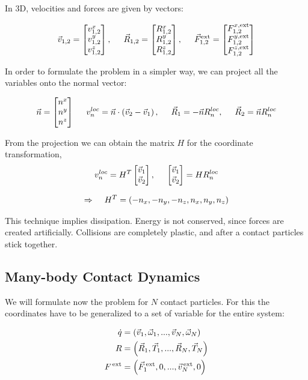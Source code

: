 In 3D, velocities and forces are given by vectors:

\begin{equation*}
\vec{v}_{1,2}=  \begin{bmatrix} v^x_{1,2}\\ v^y_{1,2}\\ v^z_{1,2} \end{bmatrix}, 
\hspace{.5cm} 
\vec{R}_{1,2} =  \begin{bmatrix} R^x_{1,2}\\ R^y_{1,2}\\ R^z_{1,2} \end{bmatrix}, 
\hspace{.5cm} 
\vec{F}^{\text{ext}}_{1,2} =  \begin{bmatrix} F^{x,\text{ext}}_{1,2}\\ F^{y, \text{ext}}_{1,2}\\ F^{z, \text{ext}}_{1,2} \end{bmatrix}
\end{equation*}

\noindent
In order to formulate the problem in a simpler way, we can project all the variables onto the normal vector:

$$
\vec{n}=  \begin{bmatrix} n^x\\ n^y\\ n^z \end{bmatrix}
\hspace{.5cm} 
{v}^{loc}_n = \vec{n} \cdot \left(\vec{v}_2 - \vec{v}_1\right), 
\hspace{.5cm}
\vec{R}_1= -\vec{n} R^{loc}_n,
\hspace{.5cm}
\vec{R}_2= \vec{n} R^{loc}_n
$$

From the projection we can obtain the matrix $H$ for the coordinate transformation,
$$
v_n^{loc} = H^T \begin{bmatrix} \vec{v}_1\\ \vec{v}_2 \end{bmatrix},
\hspace{.5cm}
 \begin{bmatrix} \vec{v}_1\\ \vec{v}_2 \end{bmatrix} = HR^{loc}_n
$$


$$
\Rightarrow \hspace{.4cm} H^T = \left(-n_x, -n_y, -n_z,n_x,n_y,n_z \right)
$$



This technique implies dissipation. Energy is not conserved, since forces are created artificially. Collisions are completely plastic, and after a contact particles stick together.




\subsection{Many-body Contact Dynamics}




We will formulate now the problem for $N$ contact particles. For this the coordinates have to be generalized to a set of variable for the entire system:


\begin{align*}
\dot{q} &= \left(\vec{v}_1,\vec{\omega}_1,...,\vec{v}_N,\vec{\omega}_N\right)\\
R       &= \left(\vec{R}_1,\vec{T}_1,...,\vec{R}_N,\vec{T}_N\right)\\
F^{\,\text{ext}} &= \left(\vec{F}^{\,\text{ext}}_1,0,...,\vec{v}^{\,\text{ext}}_N,0\right)\\
\end{align*}


